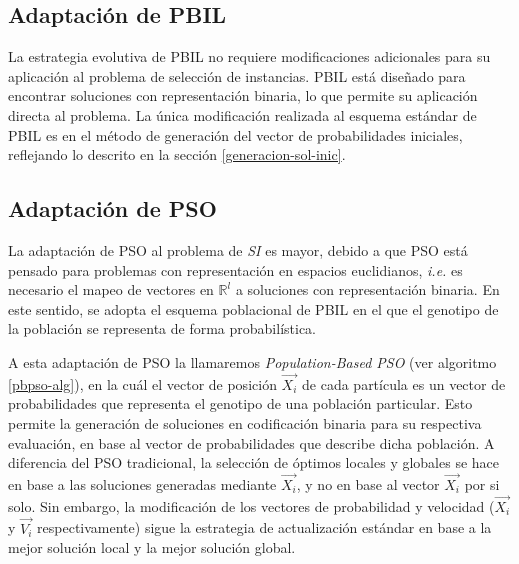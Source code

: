 \subsection{Adaptación de PBIL}

La estrategia evolutiva de PBIL no requiere modificaciones adicionales para su aplicación al problema de selección de instancias. PBIL está diseñado para encontrar soluciones con representación binaria, lo que permite su aplicación directa al problema. La única modificación realizada al esquema estándar de PBIL es en el método de generación del vector de probabilidades iniciales, reflejando lo descrito en la sección \ref{generacion-sol-inic}.

\subsection{Adaptación de PSO}

La adaptación de PSO al problema de \emph{SI} es mayor, debido a que PSO está pensado para problemas con representación en espacios euclidianos, \emph{i.e.} es necesario el mapeo de vectores en $\mathbb{R}^l$ a soluciones con representación binaria. En este sentido, se adopta el esquema poblacional de PBIL en el que el genotipo de la población se representa de forma probabilística.

A esta adaptación de PSO la llamaremos \emph{Population-Based PSO} (ver algoritmo \ref{pbpso-alg}), en la cuál el vector de posición $\vec{X_i}$ de cada partícula es un vector de probabilidades que representa el genotipo de una población particular. Esto permite la generación de soluciones en codificación binaria para su respectiva evaluación, en base al vector de probabilidades que describe dicha población. A diferencia del PSO tradicional, la selección de óptimos locales y globales se hace en base a las soluciones generadas mediante $\vec{X_i}$, y no en base al vector $\vec{X_i}$ por si solo. Sin embargo, la modificación de los vectores de probabilidad y velocidad ($\vec{X_i}$ y $\vec{V_i}$ respectivamente) sigue la estrategia de actualización estándar en base a la mejor solución local y la mejor solución global.

